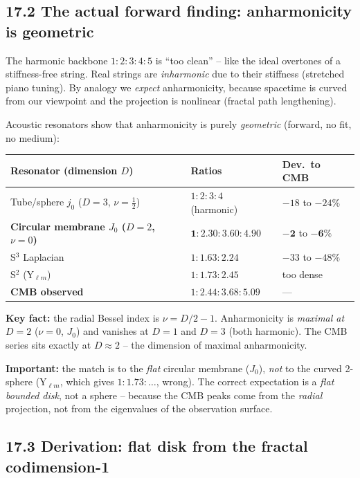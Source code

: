 \subsection*{17.2 The actual forward finding: anharmonicity is geometric}

The harmonic backbone $1:2:3:4:5$ is ``too clean'' -- like the ideal overtones
of a stiffness-free string. Real strings are \emph{inharmonic} due to their
stiffness (stretched piano tuning). By analogy we \emph{expect} anharmonicity,
because spacetime is curved from our viewpoint and the projection is nonlinear
(fractal path lengthening).

Acoustic resonators show that anharmonicity is purely \emph{geometric}
(forward, no fit, no medium):

\begin{center}
\begin{tabular}{p{5.5cm}p{4.5cm}p{2cm}}
\toprule
\textbf{Resonator (dimension $D$)} & \textbf{Ratios} & \textbf{Dev.\ to CMB} \\
\midrule
Tube/sphere $j_0$ ($D=3$, $\nu=\tfrac12$) & $1:2:3:4$ (harmonic) & $-18$ to $-24\%$ \\
\textbf{Circular membrane $J_0$ ($D=2$, $\nu=0$)} & $\mathbf{1:2.30:3.60:4.90}$ & $\mathbf{-2}$ to $\mathbf{-6\%}$ \\
S$^3$ Laplacian & $1:1.63:2.24$ & $-33$ to $-48\%$ \\
S$^2$ (Y$_{\ell m}$) & $1:1.73:2.45$ & too dense \\
\midrule
\textbf{CMB observed} & $1:2.44:3.68:5.09$ & --- \\
\bottomrule
\end{tabular}
\end{center}

\textbf{Key fact:} the radial Bessel index is $\nu = D/2-1$. Anharmonicity is
\emph{maximal at $D=2$} ($\nu=0$, $J_0$) and vanishes at $D=1$ and $D=3$ (both
harmonic). The CMB series sits exactly at $D\approx2$ -- the dimension of
maximal anharmonicity.

\textbf{Important:} the match is to the \emph{flat} circular membrane ($J_0$),
\emph{not} to the curved 2-sphere (Y$_{\ell m}$, which gives $1:1.73:\ldots$,
wrong). The correct expectation is a \emph{flat bounded disk}, not a sphere --
because the CMB peaks come from the \emph{radial} projection, not from the
eigenvalues of the observation surface.

\subsection*{17.3 Derivation: flat disk from the fractal codimension-1}


